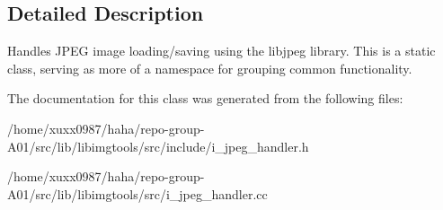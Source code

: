 \subsection{Detailed Description}
Handles J\+P\+EG image loading/saving using the libjpeg library. This is a static class, serving as more of a namespace for grouping common functionality. 

The documentation for this class was generated from the following files\+:\begin{DoxyCompactItemize}
\item 
/home/xuxx0987/haha/repo-\/group-\/\+A01/src/lib/libimgtools/src/include/i\+\_\+jpeg\+\_\+handler.\+h\item 
/home/xuxx0987/haha/repo-\/group-\/\+A01/src/lib/libimgtools/src/i\+\_\+jpeg\+\_\+handler.\+cc\end{DoxyCompactItemize}
